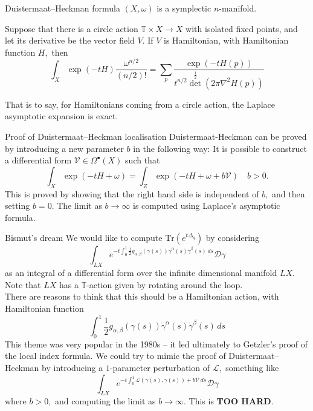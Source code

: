 \documentclass{beamer}
\numberwithin{equation}{section}
\theoremstyle{plain}
\theoremstyle{plain}
\theoremstyle{definition}
\theoremstyle{plain}
\theoremstyle{plain}
\theoremstyle{definition}
\newcommand{\Circ}{\mathbb{T}}
\newcommand{\Dc}{\mathcal{D}}
\newcommand{\Lc}{\mathcal{L}}
\newcommand{\Vc}{\mathcal{V}}
\newcommand{\Tr}{\mathrm{Tr}}
\begin{document}
\begin{frame}{Duistermaat--Heckman formula}
  $(X,\omega)$ is a symplectic $n$-manifold.
  \begin{theorem}
      Suppose that there is a circle action $\Circ\times X\to X$ with isolated fixed points, and let its derivative be the vector field $V.$ If $V$ is Hamiltonian, with Hamiltonian function $H,$ then
      \[
          \int_X \exp(-tH) \frac{\omega^{n/2}}{(n/2)!} = \sum_{p} \frac{\exp(-tH(p))}{t^{n/2}\det^{\frac12}(2\pi \nabla^2 H(p))}
      \]
  \end{theorem}
  \pause
  That is to say, for Hamiltonians coming from a circle action, the Laplace asymptotic expansion is exact.
\end{frame}

\begin{frame}{Proof of Duistermaat--Heckman localisation}
    Duistermaat-Heckman can be proved by introducing a new parameter $b$ in the following way: It is possible to construct a differential form $\Vc \in \Omega^{\bullet}(X)$ such that
    \[
      \int_X \exp(-tH+\omega) = \int_Z \exp(-tH+\omega+b\Vc)\quad b>0.
    \]
    This is proved by showing that the right hand side is independent of $b,$ and then setting $b=0.$ The limit as $b\to\infty$ is computed using Laplace's asymptotic formula.
\end{frame}

\begin{frame}{Bismut's dream}
  We would like to compute $\Tr(e^{t\Delta_g})$ by considering
  \[
    \int_{LX} e^{-t\int_0^1 \frac12 g_{\alpha,\beta}(\gamma(s))\dot{\gamma}^{\alpha}(s)\dot{\gamma}^\beta(s)\,ds} \Dc\gamma
  \]
  as an integral of a differential form over the infinite dimensional manifold $LX.$
  Note that $LX$ has a $\Circ$-action given by rotating around the loop.
  \\
  There are reasons to think that this should be a Hamiltonian action, with Hamiltonian function
  \[
  \int_0^1 \frac12 g_{\alpha,\beta}(\gamma(s))\dot{\gamma}^{\alpha}(s)\dot{\gamma}^\beta(s)\,ds
  \]
  \pause
  This theme was very popular in the 1980s -- it led ultimately to Getzler's proof of the local index formula.  
  \pause
  We could try to mimic the proof of Duistermaat--Heckman by introducing a $1$-parameter perturbation of $\Lc,$ something like
  \[
      \int_{LX} e^{-t\int_0^1 \Lc(\gamma(s),\dot{\gamma}(s))+b\Vc\,ds} \Dc\gamma
  \]
  where $b>0,$ and computing the limit as $b\to\infty.$
  \pause
  This is \textbf{TOO HARD}.
\end{frame}
\end{document}
